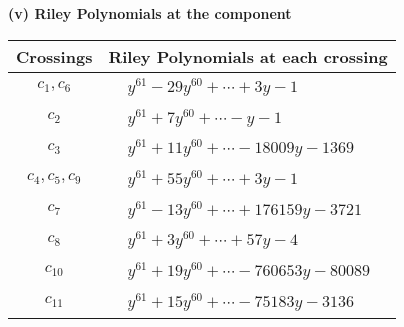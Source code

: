 \documentclass[1p]{elsarticle_modified}
\theoremstyle{definition}
\begin{document}
\newpage\renewcommand{\arraystretch}{1}
\flushleft \textbf{(v) Riley Polynomials at the component}\newline \\
\begin{tabular}{m{50pt}|m{274pt}}
Crossings & \hspace{64pt}Riley Polynomials at each crossing \\
\hline $$\begin{aligned}c_{1},c_{6}\end{aligned}$$&$\begin{aligned}
&y^{61}-29 y^{60}+\cdots+3 y-1
\end{aligned}$\\
\hline $$\begin{aligned}c_{2}\end{aligned}$$&$\begin{aligned}
&y^{61}+7 y^{60}+\cdots- y-1
\end{aligned}$\\
\hline $$\begin{aligned}c_{3}\end{aligned}$$&$\begin{aligned}
&y^{61}+11 y^{60}+\cdots-18009 y-1369
\end{aligned}$\\
\hline $$\begin{aligned}c_{4},c_{5},c_{9}\end{aligned}$$&$\begin{aligned}
&y^{61}+55 y^{60}+\cdots+3 y-1
\end{aligned}$\\
\hline $$\begin{aligned}c_{7}\end{aligned}$$&$\begin{aligned}
&y^{61}-13 y^{60}+\cdots+176159 y-3721
\end{aligned}$\\
\hline $$\begin{aligned}c_{8}\end{aligned}$$&$\begin{aligned}
&y^{61}+3 y^{60}+\cdots+57 y-4
\end{aligned}$\\
\hline $$\begin{aligned}c_{10}\end{aligned}$$&$\begin{aligned}
&y^{61}+19 y^{60}+\cdots-760653 y-80089
\end{aligned}$\\
\hline $$\begin{aligned}c_{11}\end{aligned}$$&$\begin{aligned}
&y^{61}+15 y^{60}+\cdots-75183 y-3136
\end{aligned}$\\
\hline
\end{tabular}\\~\\
\end{document}
